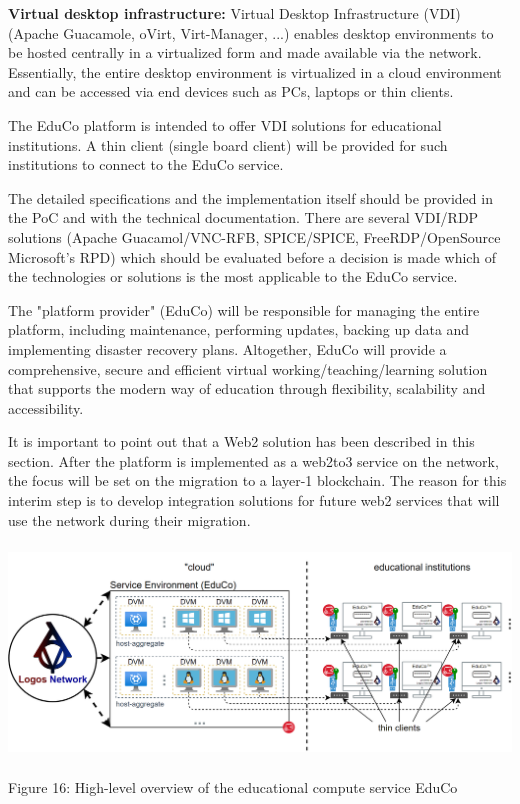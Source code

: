 \documentclass[]{article}
\begin{document}
\textbf{Virtual desktop infrastructure:}
Virtual Desktop Infrastructure (VDI) \cite{VMwareDoc-vdi} (Apache Guacamole, oVirt, Virt-Manager, ...) enables desktop environments to be hosted centrally in a virtualized form and made available via the network. 
Essentially, the entire desktop environment is virtualized in a cloud environment and can be accessed via end devices such as PCs, laptops or thin clients.
\newline

The EduCo platform is intended to offer VDI solutions for educational institutions.
A thin client (single board client) will be provided for such institutions to connect to the EduCo service.  

The detailed specifications and the implementation itself should be provided in the PoC and with the technical documentation. 
There are several VDI/RDP solutions (Apache Guacamol/VNC-RFB, SPICE/SPICE, FreeRDP/OpenSource Microsoft's RPD) which should be evaluated before a decision is made which of the technologies or solutions is the most applicable to the EduCo service.  

The "platform provider" (EduCo) will be responsible for managing the entire platform, including maintenance, performing updates, backing up data and implementing disaster recovery plans.
Altogether, EduCo will provide a comprehensive, secure and efficient virtual working/teaching/learning solution that supports the modern way of education through flexibility, scalability and accessibility.

It is important to point out that a Web2 solution has been described in this section.
After the platform is implemented as a web2to3 service on the network, the focus will be set on the migration to a layer-1 blockchain. 
The reason for this interim step is to develop integration solutions for future web2 services that will use the network during their migration. 

\begin{center}
	\includegraphics[height=5.7cm]{educo-overview}
\end{center}
\begin{center}
	Figure 16: High-level overview of the educational compute service EduCo
\end{center}
\end{document}
